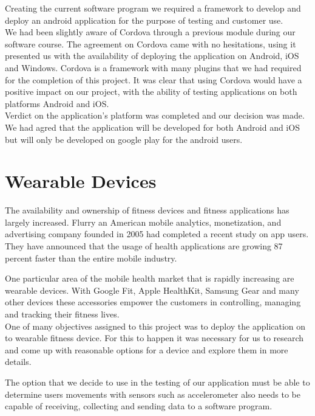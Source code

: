 \documentclass[a4paper,12pt]{report}
\begin{document}
Creating the current software program we required a framework to develop and deploy an android application for the purpose of testing and customer use.\\

We had been slightly aware of Cordova through a previous module during our software course.
The agreement on Cordova came with no hesitations, using it presented us with the availability of deploying the application on Android, iOS and Windows. 
Cordova is a framework with many plugins that we had required for the completion of this project. 
It was clear that using Cordova would have a positive impact on our project, with the ability of testing applications on both platforms Android and iOS.
\cite{cordova}\\

Verdict on the application's platform was completed and our decision was made. We had agred that the application will be developed for both Android and iOS but will only be developed on google play for the android users. 

\section{Wearable Devices}
\vspace{5mm} %
The availability and ownership of fitness devices and fitness applications has largely increased. Flurry an American mobile analytics, monetization, and advertising company founded in 2005 had completed a recent study on app users.
They have announced that the usage of health applications are growing 87 percent faster than the entire mobile industry.

One particular area of the mobile health market that is rapidly increasing are wearable devices. With Google Fit, Apple HealthKit, Samsung Gear and many other devices these accessories empower the customers in controlling, managing and tracking their fitness lives.\cite{rhodes2014accessing}\\

One of many objectives assigned to this project was to deploy the application on to wearable fitness device. 
For this to happen it was necessary for us to research and come up with reasonable options for a device and explore them in more details.

The option that we decide to use in the testing of our application must be able to determine users movements with sensors such as accelerometer also needs to be capable of receiving, collecting and sending data to a software program.\\
\end{document}
